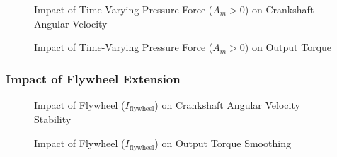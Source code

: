 \documentclass[12pt]{article}
\begin{document}
\begin{figure}[H]
    \centering
    \caption{Impact of Time-Varying Pressure Force (\(A_m > 0\)) on Crankshaft Angular Velocity}
    \label{fig:varying_f0_omega}
\end{figure}

\begin{figure}[H]
    \centering
    \caption{Impact of Time-Varying Pressure Force (\(A_m > 0\)) on Output Torque}
    \label{fig:varying_f0_torque}
\end{figure}


\subsubsection{Impact of Flywheel Extension}

\begin{figure}[H]
    \centering
    \caption{Impact of Flywheel (\(I_{\text{flywheel}}\)) on Crankshaft Angular Velocity Stability}
    \label{fig:flywheel_omega}
\end{figure}

\begin{figure}[H]
    \centering
    \caption{Impact of Flywheel (\(I_{\text{flywheel}}\)) on Output Torque Smoothing}
    \label{fig:flywheel_torque}
\end{figure}
\end{document}
